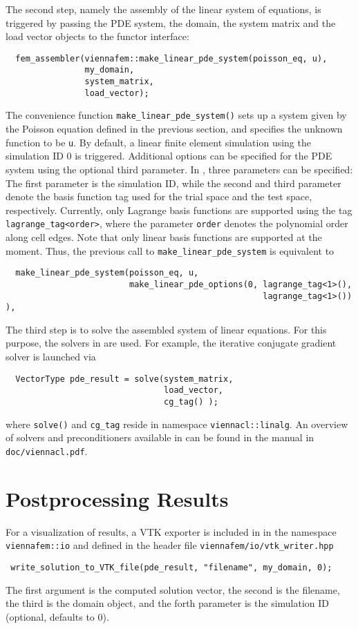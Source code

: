 The second step, namely the assembly of the linear system of equations, is triggered by passing the PDE system, the domain, the system matrix and the load vector objects to the functor interface:
\begin{lstlisting}
  fem_assembler(viennafem::make_linear_pde_system(poisson_eq, u),
                my_domain,
                system_matrix,
                load_vector);
\end{lstlisting}
The convenience function \lstinline|make_linear_pde_system()| sets up a system given by the Poisson equation defined in the previous section, and specifies the unknown function to be \lstinline|u|. By default, a linear finite element simulation using the simulation ID $0$ is triggered.
Additional options can be specified for the PDE system using the optional third parameter. In {\ViennaFEMversion}, three parameters can be specified:
The first parameter is the simulation ID, while the second and third parameter denote the basis function tag used for the trial space and the test space, respectively.
Currently, only Lagrange basis functions are supported using the tag \lstinline|lagrange_tag<order>|, where the parameter \lstinline|order| denotes the polynomial order along cell edges.
Note that only linear basis functions are supported at the moment.
Thus, the previous call to \lstinline|make_linear_pde_system| is equivalent to
\begin{lstlisting}
  make_linear_pde_system(poisson_eq, u,
                         make_linear_pde_options(0, lagrange_tag<1>(),
                                                    lagrange_tag<1>()) ),
\end{lstlisting}

The third step is to solve the assembled system of linear equations. For this purpose, the solvers in {\ViennaCL} are used.
For example, the iterative conjugate gradient solver is launched via
\begin{lstlisting}
  VectorType pde_result = solve(system_matrix,
                                load_vector,
                                cg_tag() );
\end{lstlisting}
where \lstinline|solve()| and \lstinline|cg_tag| reside in namespace \lstinline|viennacl::linalg|.
An overview of solvers and preconditioners available in {\ViennaCL} can be found in the {\ViennaCL} manual in \lstinline|doc/viennacl.pdf|.


\section{Postprocessing Results}
For a visualization of results, a VTK exporter is included in {\ViennaFEM} in the namespace \lstinline|viennafem::io| and defined in the header file \lstinline|viennafem/io/vtk_writer.hpp|
\begin{lstlisting}
 write_solution_to_VTK_file(pde_result, "filename", my_domain, 0);
\end{lstlisting}
The first argument is the computed solution vector, the second is the filename, the third is the domain object, and the forth parameter is the simulation ID (optional, defaults to $0$).


